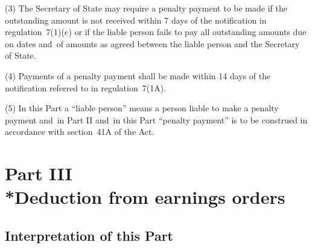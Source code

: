 \documentclass[12pt,a4paper]{article}
\begin{document}
(3) The Secretary of State may require a penalty payment to be made if the outstanding amount is not received within 7 days of the notification in regulation~7(1)($e$)  or if the liable person fails to pay all outstanding amounts due on dates and~of amounts as agreed between the liable person and the Secretary of State.

(4) Payments of a penalty payment shall be made within 14 days of the notification referred to in regulation~7(1A).

(5) In this Part a “liable person” means a person liable to make a penalty payment and~in Part II and~in this Part “penalty payment” is to be construed in accordance with section~41A of the Act.


\section[Part III --- Deduction from earnings orders]{Part III\\*Deduction from earnings orders}

\renewcommand\parthead{--- Part III}

\subsection[8. Interpretation of this Part]{Interpretation of this Part}
\end{document}
